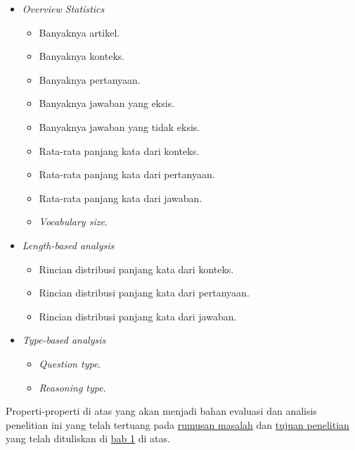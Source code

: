 \begin{itemize}

    \item \emph{Overview Statistics}

        \begin{itemize}
            \item Banyaknya artikel.
            \item Banyaknya konteks.
            \item Banyaknya pertanyaan.
            \item Banyaknya jawaban yang eksis.
            \item Banyaknya jawaban yang tidak eksis.
            \item Rata-rata panjang kata dari konteks.
            \item Rata-rata panjang kata dari pertanyaan.
            \item Rata-rata panjang kata dari jawaban.
            \item \emph{Vocabulary size}.
        \end{itemize}

    \item \emph{Length-based analysis}

        \begin{itemize}
            \item Rincian distribusi panjang kata dari konteks.
            \item Rincian distribusi panjang kata dari pertanyaan.
            \item Rincian distribusi panjang kata dari jawaban.
        \end{itemize}
        
    \item \emph{Type-based analysis}

        \begin{itemize}
            \item \emph{Question type}.
            \item \emph{Reasoning type}.
        \end{itemize}

\end{itemize}

Properti-properti di atas yang akan menjadi bahan evaluasi dan analisis penelitian ini yang telah tertuang pada \hyperref[sec:rumusanMasalah]{rumusan masalah} dan \hyperref[sec:tujuanPenelitian]{tujuan penelitian} yang telah dituliskan di \hyperref[bab:1]{bab 1} di atas.


